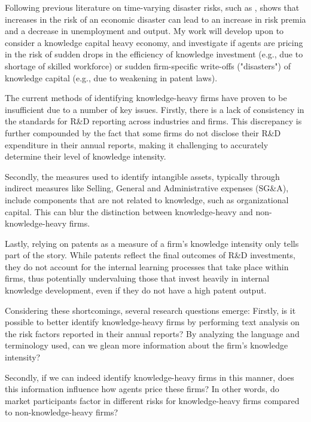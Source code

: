 \documentclass[12pt, letterpaper]{article}
\begin{document}
Following previous literature on time-varying disaster risks, such as \citep{Gabaix2012-kw, Barro2006-pt, Rietz1988-ds}, \citep{Gourio2012-nt} shows that increases in the risk of an economic disaster can lead to an increase in risk premia and a decrease in unemployment and output. My work will develop upon \citep{Gourio2012-nt} to consider a knowledge capital heavy economy, and investigate if agents are pricing in the risk of sudden drops in the efficiency of knowledge investment (e.g., due to shortage of skilled workforce) or sudden firm-specific write-offs ("disasters") of knowledge capital (e.g., due to weakening in patent laws).

The current methods of identifying knowledge-heavy firms have proven to be insufficient due to a number of key issues. Firstly, there is a lack of consistency in the standards for R\&D reporting across industries and firms. This discrepancy is further compounded by the fact that some firms do not disclose their R\&D expenditure in their annual reports, making it challenging to accurately determine their level of knowledge intensity.

Secondly, the measures used to identify intangible assets, typically through indirect measures like Selling, General and Administrative expenses (SG\&A), include components that are not related to knowledge, such as organizational capital. This can blur the distinction between knowledge-heavy and non-knowledge-heavy firms.

Lastly, relying on patents as a measure of a firm's knowledge intensity only tells part of the story. While patents reflect the final outcomes of R\&D investments, they do not account for the internal learning processes that take place within firms, thus potentially undervaluing those that invest heavily in internal knowledge development, even if they do not have a high patent output.

Considering these shortcomings, several research questions emerge: Firstly, is it possible to better identify knowledge-heavy firms by performing text analysis on the risk factors reported in their annual reports? By analyzing the language and terminology used, can we glean more information about the firm's knowledge intensity?

Secondly, if we can indeed identify knowledge-heavy firms in this manner, does this information influence how agents price these firms? In other words, do market participants factor in different risks for knowledge-heavy firms compared to non-knowledge-heavy firms?
\end{document}
